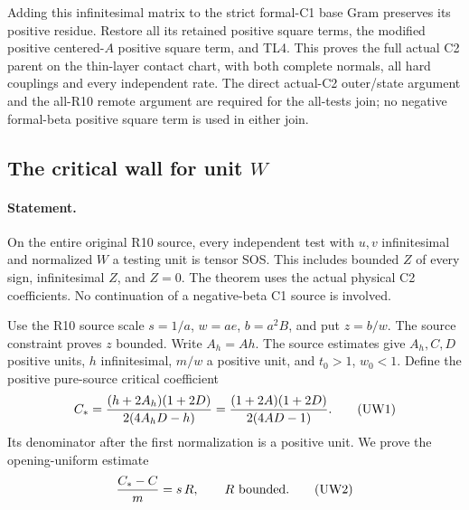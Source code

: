 Adding this infinitesimal matrix to the strict formal-C1 base Gram
preserves its positive residue. Restore all its retained positive square terms,
the modified positive centered-$A$ positive square term, and TL4. This proves the
full actual C2 parent on the thin-layer contact chart, with both
complete normals, all hard couplings and every independent rate.
The direct actual-C2 outer/state argument and the all-R10 remote
argument are required for the all-tests join; no negative formal-beta
positive square term is used in either join.

\subsection{The critical wall for unit $W$}
\label{component:pf1aac1dff7c7}

\paragraph{Statement.}
On the entire original R10 source, every independent test with $u,v$
infinitesimal and normalized $W$ a testing unit is tensor SOS. This
includes bounded $Z$ of every sign, infinitesimal $Z$, and $Z=0$.
The theorem uses the actual physical C2 coefficients. No continuation
of a negative-beta C1 source is involved.

Use the R10 source scale $s=1/a$, $w=ae$, $b=a^2B$, and put
$z=b/w$. The source constraint proves $z$ bounded. Write $A_h=Ah$.
The source estimates give $A_h,C,D$ positive units, $h$ infinitesimal,
$m/w$ a positive unit, and $t_0>1$, $w_0<1$.
Define the positive pure-source critical coefficient
\[
 C_*={ (h+2A_h)(1+2D)\over 2(4A_hD-h)}
     ={(1+2A)(1+2D)\over2(4AD-1)}.
 \tag{UW1}
\]
Its denominator after the first normalization is a positive unit.
We prove the opening-uniform estimate
\[
                 {C_*-C\over m}=s\,R,
                 \qquad R\text{ bounded}.             \tag{UW2}
\]

